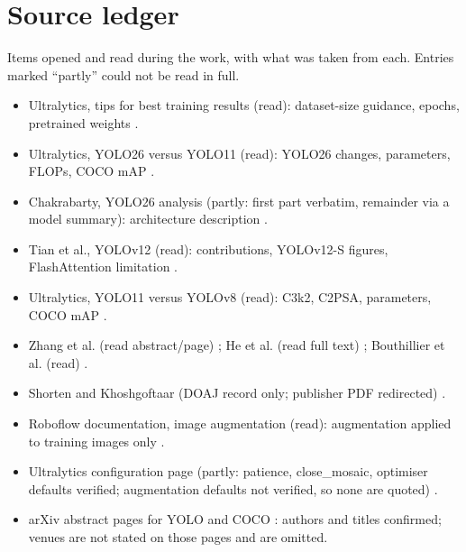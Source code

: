 \documentclass[11pt,a4paper]{article}
\begin{document}
\section{Source ledger}
Items opened and read during the work, with what was taken from each. Entries marked ``partly'' could not be read in full.
\begin{itemize}[leftmargin=1.4em,itemsep=1pt,font=\small]
  \item Ultralytics, tips for best training results (read): dataset-size guidance, epochs, pretrained weights \cite{ultralytics_tips}.
  \item Ultralytics, YOLO26 versus YOLO11 (read): YOLO26 changes, parameters, FLOPs, COCO mAP \cite{ultralytics_yolo26_vs_11}.
  \item Chakrabarty, YOLO26 analysis (partly: first part verbatim, remainder via a model summary): architecture description \cite{chakrabarty2026yolo26}.
  \item Tian et al., YOLOv12 (read): contributions, YOLOv12-S figures, FlashAttention limitation \cite{tian2025yolov12}.
  \item Ultralytics, YOLO11 versus YOLOv8 (read): C3k2, C2PSA, parameters, COCO mAP \cite{ultralytics_yolo11_vs_v8}.
  \item Zhang et al. (read abstract/page) \cite{zhang2017rethinking}; He et al. (read full text) \cite{he2019rethinking}; Bouthillier et al. (read) \cite{bouthillier2021variance}.
  \item Shorten and Khoshgoftaar (DOAJ record only; publisher PDF redirected) \cite{shorten2019survey}.
  \item Roboflow documentation, image augmentation (read): augmentation applied to training images only \cite{roboflow_augmentation}.
  \item Ultralytics configuration page (partly: patience, close\_mosaic, optimiser defaults verified; augmentation defaults not verified, so none are quoted) \cite{ultralytics_cfg}.
  \item arXiv abstract pages for YOLO \cite{redmon2015yolo} and COCO \cite{lin2014coco}: authors and titles confirmed; venues are not stated on those pages and are omitted.
\end{itemize}



\end{document}
